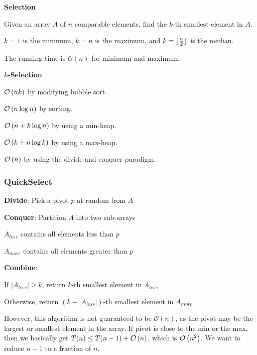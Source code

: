 \begin{listu}
    \item \textbf{Selection}
    
    \begin{listu}
        \item Given an array $A$ of $n$ comparable elements, find the $k$-th smallest element in $A$. 
        \item $k = 1$ is the minimum, $k = n$ is the maximum, and $k = \lfloor \frac{n}{2} \rfloor$ is the median. 
        \item The running time is $\mathcal{O}(n)$ for minimum and maximum. 
    \end{listu}

    \item \textbf{$k$-Selection}

    \begin{listu}
        \item $\mathcal{O}\left(nk\right)$ by modifying bubble sort.
        \item $\mathcal{O}\left(n \log n\right)$ by sorting. 
        \item $\mathcal{O}\left(n + k \log n\right)$ by using a min-heap.
        \item $\mathcal{O}\left(k + n \log k\right)$ by using a max-heap.
        \item $\mathcal{O}\left(n\right)$ by using the divide and conquer paradigm.
    \end{listu}
\end{listu}

\subsubsection{QuickSelect}

\begin{listu}
    \item \textbf{Divide}: Pick a pivot $p$ at random from $A$

    \item \textbf{Conquer}: Partition $A$ into two sub-arrays 
    
    \begin{listu}
        \item $A_{less}$ contains all elements less than $p$
        \item $A_{more}$ contains all elements greater than $p$
    \end{listu}

    \item \textbf{Combine}: 
    \begin{listu}
        \item If $|A_{less}| \ge k$, return $k$-th smallest element in $A_{less}$
        \item Otherwise, return $(k - |A_{less}|)$-th smallest element in $A_{more}$
    \end{listu}
\end{listu}

However, this algorithm is not guaranteed to be $\mathcal{O}(n)$, as the pivot may be the largest or smallest element in the array. If pivot is close to the min or the max, then we basically get $T(n) \le T(n - 1) + \mathcal{O}\left(n\right)$, which is $\mathcal{O}\left(n^2\right)$. We want to reduce $n - 1$ to a fraction of $n$. 

